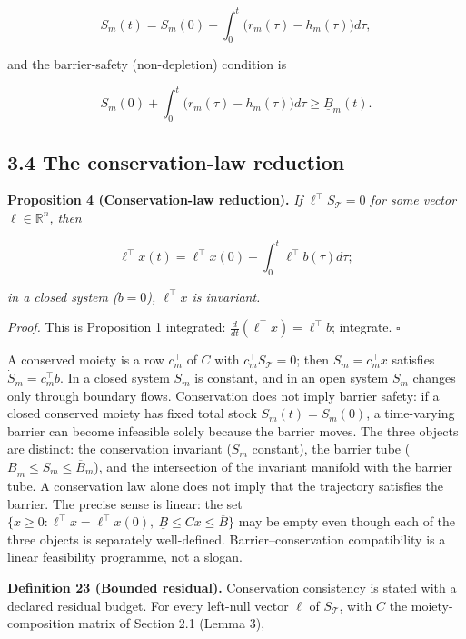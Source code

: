 \documentclass[11pt]{article}
\begin{document}
$$S_m(t) = S_m(0) + \int_0^t \bigl( r_m(\tau) - h_m(\tau) \bigr) d\tau,$$

 and the barrier-safety (non-depletion) condition is 

$$S_m(0) + \int_0^t \bigl( r_m(\tau) - h_m(\tau) \bigr) d\tau \ge \underline{B}_m(t).$$



\subsection*{3.4 The conservation-law reduction}\label{34-the-conservation-law-reduction}

\textbf{Proposition 4 (Conservation-law reduction).} \emph{If \(\ell^\top S_{\mathcal{T}} = 0\) for some vector \(\ell \in \mathbb{R}^n\), then} 

$$\ell^\top x(t) = \ell^\top x(0) + \int_0^t \ell^\top b(\tau) d\tau;$$

 \emph{in a closed system (\(b = 0\)), \(\ell^\top x\) is invariant.}

\emph{Proof.} This is Proposition 1 integrated: \(\frac{d}{dt}(\ell^\top x) =\allowbreak{} \ell^\top b\); integrate. \(\square\)

A conserved moiety is a row \(c_m^\top\) of \(C\) with \(c_m^\top S_{\mathcal{T}} = 0\); then \(S_m = c_m^\top x\) satisfies \(\dot S_m = c_m^\top b\). In a closed system \(S_m\) is constant, and in an open system \(S_m\) changes only through boundary flows. Conservation does not imply barrier safety: if a closed conserved moiety has fixed total stock \(S_m(t) = S_m(0)\), a time-varying barrier can become infeasible solely because the barrier moves. The three objects are distinct: the conservation invariant (\(S_m\) constant), the barrier tube (\(\underline{B}_m \le S_m \le \overline{B}_m\)), and the intersection of the invariant manifold with the barrier tube. A conservation law alone does not imply that the trajectory satisfies the barrier. The precise sense is linear: the set \(\{x \ge 0 : \ell^\top x =\allowbreak{} \ell^\top x(0),\allowbreak{}\ \underline{B} \le Cx \le \overline{B}\}\) may be empty even though each of the three objects is separately well-defined. Barrier--conservation compatibility is a linear feasibility programme, not a slogan.

\textbf{Definition 23 (Bounded residual).} Conservation consistency is stated with a declared residual budget. For every left-null vector \(\ell\) of \(S_{\mathcal{T}}\), with \(C\) the moiety-composition matrix of Section 2.1 (Lemma 3), 
\end{document}
